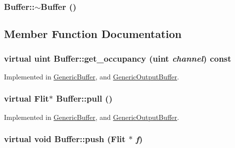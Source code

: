 \hypertarget{classBuffer_59b8743e4a5f731bdd0c4185c9ef263b}{
\subsubsection[{$\sim$Buffer}]{\setlength{\rightskip}{0pt plus 5cm}Buffer::$\sim$Buffer ()}}
\label{classBuffer_59b8743e4a5f731bdd0c4185c9ef263b}




\subsection{Member Function Documentation}
\hypertarget{classBuffer_af4e2d4031945429ae58350b5897570a}{
\subsubsection[{get\_\-occupancy}]{\setlength{\rightskip}{0pt plus 5cm}virtual {\bf uint} Buffer::get\_\-occupancy ({\bf uint} {\em channel}) const}}
\label{classBuffer_af4e2d4031945429ae58350b5897570a}




Implemented in \hyperlink{classGenericBuffer_f2f85cf979616bab9dad5373d25d7813}{GenericBuffer}, and \hyperlink{classGenericOutputBuffer_0b8b70b9b3ab71195eea8d0d810dce94}{GenericOutputBuffer}.\hypertarget{classBuffer_95f5c230f9c261bc13ddcfafcc340e7e}{
\subsubsection[{pull}]{\setlength{\rightskip}{0pt plus 5cm}virtual {\bf Flit}$\ast$ Buffer::pull ()}}
\label{classBuffer_95f5c230f9c261bc13ddcfafcc340e7e}




Implemented in \hyperlink{classGenericBuffer_6ce6f151eb6f65ec1fffafffb04a8f0e}{GenericBuffer}, and \hyperlink{classGenericOutputBuffer_3c3f1b425635f59b0539805945ddb1bd}{GenericOutputBuffer}.\hypertarget{classBuffer_c9dce1860c655146f000df30314caaa9}{
\subsubsection[{push}]{\setlength{\rightskip}{0pt plus 5cm}virtual void Buffer::push ({\bf Flit} $\ast$ {\em f})}}
\label{classBuffer_c9dce1860c655146f000df30314caaa9}




